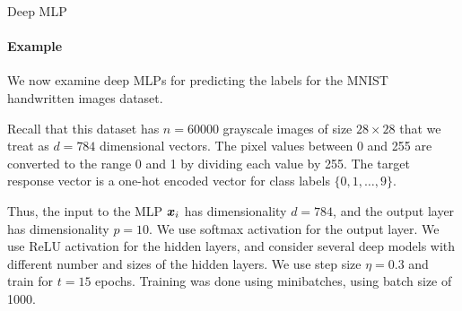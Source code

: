 %
%
\begin{frame}{Deep MLP}
\framesubtitle{Example}
    We now examine deep MLPs for predicting the labels for the
    MNIST handwritten images dataset.

\medskip

Recall that this dataset has
    $n=60000$ grayscale images of size $28\times28$ that we treat as
    $d=784$ dimensional vectors. 
    The pixel values between 0 and 255 are converted to the range 0 and
    1 by dividing each value by 255.
    The target response vector is a one-hot
    encoded vector for class labels $\{0,1,\ldots,9\}$. 

\medskip

    Thus, the input to the MLP ${\boldsymbol x}_i$ has dimensionality $d=784$, and
    the output layer has dimensionality $p=10$. We use softmax
    activation for the output layer. We use ReLU activation for the
    hidden layers, and consider several deep models with different
    number and sizes of the hidden layers. We use step size $\eta=0.3$
    and train for $t=15$ epochs.
    Training was done using minibatches, using batch size of 1000.
\end{frame}

